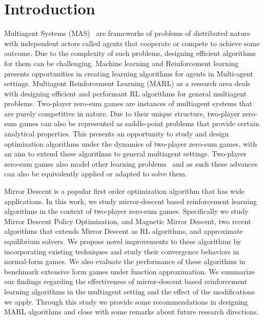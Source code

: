 \chapter{Introduction}

Multiagent Systems (MAS)~\cite{tuylsMultiagent2012} are frameworks of problems of distributed
nature with independent actors called agents that cooperate or compete to achieve some outcome.
Due to the complexity of such problems, designing efficient algorithms for them can be challenging.
Machine learning and Reinforcement learning presents opportunities in creating learning algorithms
for agents in Multi-agent settings.
Multiagent Reinforcement Learning (MARL) as a research area deals with designing efficient and
performant RL algorithms for general multiagent problems.
Two-player zero-sum games are instances of multiagent systems that are purely competitive in
nature.
Due to their unique structure, two-player zero-sum games can also be represented as saddle-point
problems that provide certain analytical properties.
This presents an opportunity to study and design optimization algorithms under the dynamics of
two-player zero-sum games, with an aim to extend these algorithms to general multiagent settings.
Two-player zero-sum games also model other learning problems~\cite{goodfellowGenerative2014} and as
such these advances can also be equivalently applied or adapted to solve them.

Mirror Descent is a popular first order optimization algorithm that has wide applications.
In this work, we study mirror-descent based reinforcement learning algorithms in the context of
two-player zero-sum games.
Specifically we study Mirror Descent Policy Optimization, and Magnetic Mirror Descent, two recent
algorithms that extends Mirror Descent as RL algorithms, and approximate equilibrium solvers.
We propose novel improvements to these algorithms by incorporating existing techniques and study
their convergence behaviors in normal-form games.
We also evaluate the performance of these algorithms in benchmark extensive form games under
function approximation.
We summarize our findings regarding the effectiveness of mirror-descent based reinforcement
learning algorithms in the multiagent setting and the effect of the modifications we apply.
Through this study we provide some recommendations in designing MARL algorithms and close with some
remarks about future research directions.

